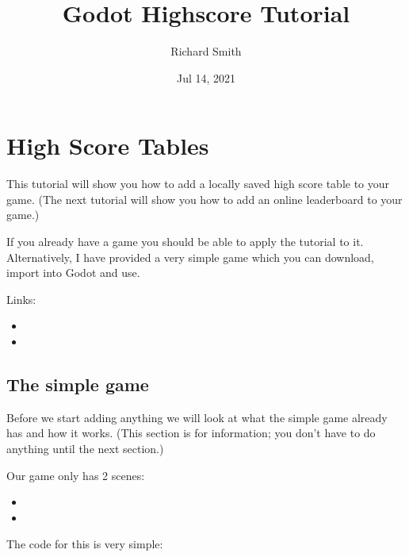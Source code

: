 \documentclass[letterpaper,10pt,english]{sphinxmanual}
\title{Godot Highscore Tutorial}
\date{Jul 14, 2021}
\author{Richard Smith}
\begin{document}
\pagestyle{empty}
\sphinxmaketitle
\pagestyle{plain}
\sphinxtableofcontents
\pagestyle{normal}
\label{\detokenize{index::doc}}



\chapter{High Score Tables}
\label{\detokenize{tutorial:high-score-tables}}\label{\detokenize{tutorial::doc}}
\sphinxAtStartPar
This tutorial will show you how to add a locally saved high score table
to your game. (The next tutorial will show you how to add an online
leaderboard to your game.)

\sphinxAtStartPar
If you already have a game you should be able to apply the tutorial to
it. Alternatively, I have provided a very simple game which you can
download, import into Godot and use.

\sphinxAtStartPar
Links:
\begin{itemize}
\item {} 
\sphinxAtStartPar
{}

\item {} 
\sphinxAtStartPar
{}

\end{itemize}


\section{The simple game}
\label{\detokenize{tutorial:the-simple-game}}
\sphinxAtStartPar
Before we start adding anything we will look at what the simple game
already has and how it works. (This section is for information; you
don’t have to do anything until the next section.)

\sphinxAtStartPar
Our game only has 2 scenes:
\begin{itemize}
\item {} 
\sphinxAtStartPar
{}

\item {} 
\sphinxAtStartPar
{}

\end{itemize}

\sphinxAtStartPar
The code for this is very simple:
\end{document}
